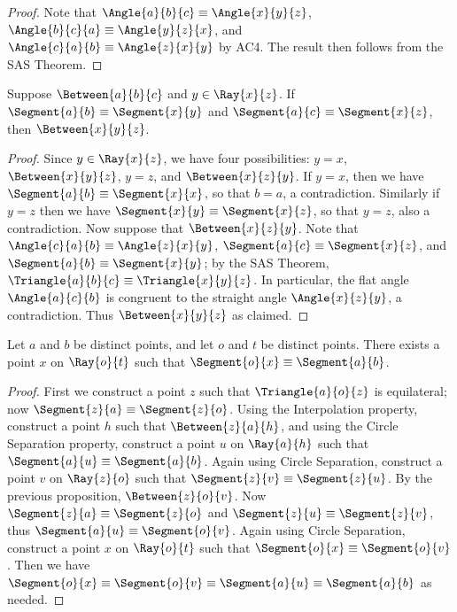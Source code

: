 \documentclass{article}
\begin{document}
\begin{proof}
Note that $\Angle{a}{b}{c} \equiv \Angle{x}{y}{z}$, $\Angle{b}{c}{a} \equiv \Angle{y}{z}{x}$, and $\Angle{c}{a}{b} \equiv \Angle{z}{x}{y}$ by AC4. The result then follows from the SAS Theorem.
\end{proof}

\begin{lem}
Suppose $\Between{a}{b}{c}$ and $y \in \Ray{x}{z}$. If $\Segment{a}{b} \equiv \Segment{x}{y}$ and $\Segment{a}{c} \equiv \Segment{x}{z}$, then $\Between{x}{y}{z}$.
\end{lem}

\begin{proof}
Since $y \in \Ray{x}{z}$, we have four possibilities: $y = x$, $\Between{x}{y}{z}$, $y = z$, and $\Between{x}{z}{y}$. If $y = x$, then we have $\Segment{a}{b} \equiv \Segment{x}{x}$, so that $b = a$, a contradiction. Similarly if $y = z$ then we have $\Segment{x}{y} \equiv \Segment{x}{z}$, so that $y = z$, also a contradiction. Now suppose that $\Between{x}{z}{y}$. Note that $\Angle{c}{a}{b} \equiv \Angle{z}{x}{y}$, $\Segment{a}{c} \equiv \Segment{x}{z}$, and $\Segment{a}{b} \equiv \Segment{x}{y}$; by the SAS Theorem, $\Triangle{a}{b}{c} \equiv \Triangle{x}{y}{z}$. In particular, the flat angle $\Angle{a}{c}{b}$ is congruent to the straight angle $\Angle{x}{z}{y}$, a contradiction. Thus $\Between{x}{y}{z}$ as claimed.
\end{proof}

\begin{construct}
Let $a$ and $b$ be distinct points, and let $o$ and $t$ be distinct points. There exists a point $x$ on $\Ray{o}{t}$ such that $\Segment{o}{x} \equiv \Segment{a}{b}$.
\end{construct}

\begin{proof}
First we construct a point $z$ such that $\Triangle{a}{o}{z}$ is equilateral; now $\Segment{z}{a} \equiv \Segment{z}{o}$. Using the Interpolation property, construct a point $h$ such that $\Between{z}{a}{h}$, and using the Circle Separation property, construct a point $u$ on $\Ray{a}{h}$ such that $\Segment{a}{u} \equiv \Segment{a}{b}$. Again using Circle Separation, construct a point $v$ on $\Ray{z}{o}$ such that $\Segment{z}{v} \equiv \Segment{z}{u}$. By the previous proposition, $\Between{z}{o}{v}$. Now $\Segment{z}{a} \equiv \Segment{z}{o}$ and $\Segment{z}{u} \equiv \Segment{z}{v}$, thus $\Segment{a}{u} \equiv \Segment{o}{v}$. Again using Circle Separation, construct a point $x$ on $\Ray{o}{t}$ such that $\Segment{o}{x} \equiv \Segment{o}{v}$. Then we have $\Segment{o}{x} \equiv \Segment{o}{v} \equiv \Segment{a}{u} \equiv \Segment{a}{b}$ as needed.
\end{proof}
\end{document}
